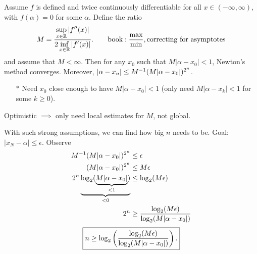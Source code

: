 \documentclass[]{article}
\begin{document}
\begin{theorem}
	[Optimistic] Assume $f$ is defined and twice continuously differentiable for all $x\in(-\infty,\infty)$, with $f(\alpha)=0$ for some $\alpha$.
	Define the ratio
	$$ M = \frac{\ds\sup_{x\in\mb R}|f''(x)|}{2\ds\inf_{x\in\mb R}|f'(x)|}. \qquad \text{book} : \frac\max\min, \text{correcting for asymptotes} $$
	and assume that $M<\infty$. Then for any $x_0$ such that $M|\alpha-x_0|<1$, Newton's method converges.
	Moreover, $|\alpha-x_n|\leq M\inv(M|\alpha-x_0|)^{2^n}$.
	\begin{enumerate}
		\item[$*$] Need $x_0$ close enough to have $M|\alpha-x_0|<1$ (only need $M|\alpha-x_k|<1$ for some $k\geq0$).
	\end{enumerate}
	Optimistic $\implies$ only need local estimates for $M$, not global.
\end{theorem}
\begin{observe}
	With such strong assumptions, we can find how big $n$ needs to be. Goal: $|x_N-\alpha|\leq\epsilon$. Observe
	\begin{align*}
		M\inv(M|\alpha-x_0|)^{2^n} &\leq \epsilon \\
		(M|\alpha-x_0|)^{2^n} &\leq M\epsilon \\
		2^n \ub{<0}{\log_2(\ub{<1}{M|\alpha-x_0|})} &\leq \log_2(M\epsilon) \\
		2^n &\geq \frac{\log_2(M\epsilon)}{\log_2(M|\alpha-x_0|)}
	\end{align*}
	$$\fbox{$\ds n\geq \log_2\plr{\frac{\log_2(M\epsilon)}{\log_2(M|\alpha-x_0|)}}. $}$$
\end{observe}
\end{document}
